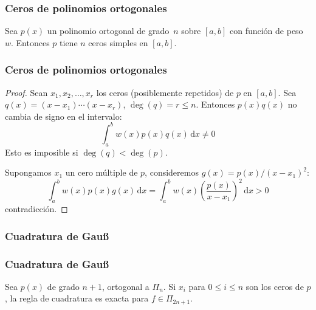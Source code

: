 \documentclass[english, spanish, fleqn,%
hyperref = {colorlinks, urlcolor = blue}%
]{beamer}
\begin{document}
\begin{frame}
  \frametitle{Ceros de polinomios ortogonales}

  \begin{theorem}
    Sea \(p(x)\) un polinomio ortogonal de grado~\(n\) sobre \([a, b]\)
    con función de peso \(w\).
    Entonces \(p\) tiene \(n\) ceros simples en \([a, b]\).
  \end{theorem}
\end{frame}

\begin{frame}
  \frametitle{Ceros de polinomios ortogonales}

  \begin{proof}
    Sean \(x_1, x_2, \dotsc, x_r\) los ceros
    (posiblemente repetidos)
    de \(p\) en \([a, b]\).
    Sea \(q(x) = (x - x_1) \dotsm (x - x_r)\),
    \(\deg(q) = r \le n\).
    Entonces \(p(x) q(x)\) no cambia de signo en el intervalo:
    \begin{equation*}
      \int_a^b w(x) p(x) q(x) \, \mathrm{d} x
        \ne 0
    \end{equation*}
    Esto es imposible si \(\deg(q) < \deg(p)\).

    Supongamos \(x_1\) un cero múltiple de \(p\),
    consideremos \(g(x) = p(x) / (x - x_1)^2\):
    \begin{equation*}
      \int_a^b w(x) p(x) g(x) \, \mathrm{d} x
        = \int_a^b w(x) \left(\frac{p(x)}{x - x_1}\right)^2 \, \mathrm{d} x
        > 0
    \end{equation*}
    contradicción.
  \end{proof}
\end{frame}

\begin{frame}
  \setcounter{beamerpauses}{2}
  \frametitle{Cuadratura de Gauß}

\end{frame}

\begin{frame}
  \frametitle{Cuadratura de Gauß}

  \begin{theorem}
    Sea \(p(x)\) de grado \(n + 1\),
    ortogonal a \(\Pi_n\).
    Si \(x_i\) para \(0 \le i \le n\) son los ceros de \(p\),
    la regla de cuadratura es exacta para \(f \in \Pi_{2 n + 1}\).
  \end{theorem}
\end{frame}
\end{document}
